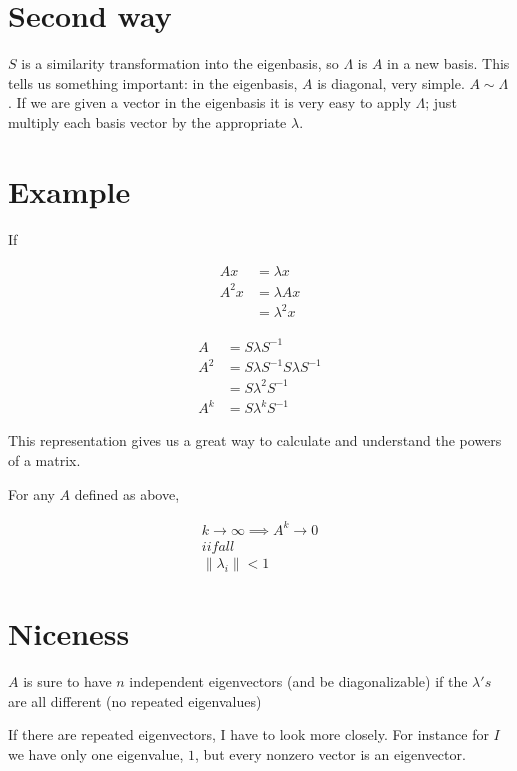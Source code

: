 \documentclass{article}
\begin{document}
\section{Second way}
$S$ is a similarity transformation into the eigenbasis, so $\Lambda$ is $A$ in a new basis. This tells us something important: in the eigenbasis, $A$ is diagonal, very simple. $A \sim \Lambda$. If we are given a vector in the eigenbasis it is very easy to apply $\Lambda$; just multiply each basis vector by the appropriate $\lambda$.

\section{Example}

If

\begin{align}
Ax &= \lambda x \\
A^2 x &= \lambda Ax \\
&= \lambda^2 x
\end{align}

\begin{align}
A &= S \lambda S^{-1} \\
A^2 &= S \lambda S^{-1} S \lambda S^{-1} \\
&= S \lambda^2 S^{-1} \\
A^k &= S \lambda^k S^{-1}
\end{align}

This representation gives us a great way to calculate and understand the powers of a matrix.

For any $A$ defined as above,

\begin{align}
k \rightarrow \infty \implies A^k \rightarrow 0 \\
iif all \\
\|\lambda_i\| < 1
\end{align}

\section{Niceness}

$A$ is sure to have $n$ independent eigenvectors (and be diagonalizable) if the $\lambda's$ are all different (no repeated eigenvalues)

If there are repeated eigenvectors, I have to look more closely. For instance for $I$ we have only one eigenvalue, $1$, but every nonzero vector is an eigenvector.
\end{document}
